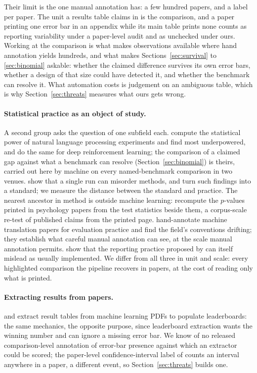 \documentclass{article}
\begin{document}
Their limit is the one manual annotation has: a few hundred papers, and a
label per paper. The unit a results table claims in is the comparison, and a
paper printing one error bar in an appendix while its main table prints none
counts as reporting variability under a paper-level audit and as unchecked
under ours. Working at the comparison is what makes
\nComparisonsTwentyFive{} observations available where hand annotation yields
hundreds, and what makes Sections~\ref{sec:survival} to \ref{sec:binomial}
askable: whether the claimed difference survives its own error bars, whether
a design of that size could have detected it, and whether the benchmark can
resolve it. What automation costs is judgement on an ambiguous table, which is
why Section~\ref{sec:threats} measures what ours gets wrong.

\paragraph{Statistical practice as an object of study.} A second group asks the
question of one subfield each. \citet{card2020with} compute the statistical
power of natural language processing experiments and find most underpowered,
and \citet{colas2018how} do the same for deep reinforcement learning; the
comparison of a claimed gap against what a benchmark can resolve
(Section~\ref{sec:binomial}) is theirs, carried out here by machine on every
named-benchmark comparison in two venues. \citet{reimers2017reporting} show
that a single run can misorder methods, and \citet{ulmer2022experimental} turn
such findings into a standard; we measure the distance between the standard
and practice. The nearest ancestor in method is outside machine learning:
\citet{nuijten2016prevalence} recompute the $p$-values printed in psychology
papers from the test statistics beside them, a corpus-scale re-test of
published claims from the printed page.
\citet{marie2021scientific} hand-annotate machine translation papers for
evaluation practice and find the field's conventions drifting; they establish
what careful manual annotation can see, at the scale manual annotation permits.
\citet{tang2020showing} show that the reporting practice proposed by
\citet{dodge2019show} can itself mislead as usually implemented. We differ from
all three in unit and scale: every highlighted comparison the pipeline
recovers in \nPapersTotal{} papers, at the cost of reading only what is
printed.

\paragraph{Extracting results from papers.} \citet{hou2019identification} and
\citet{kardas2020axcell} extract result tables from machine learning PDFs to
populate leaderboards: the same mechanics, the opposite purpose, since
leaderboard extraction wants the winning number and can ignore a missing error
bar. We know of no released comparison-level annotation of error-bar
presence against which an extractor could be scored; the paper-level
confidence-interval label of \citet{kirly2018nips} counts an interval anywhere
in a paper, a different event, so Section~\ref{sec:threats} builds one.
\end{document}
